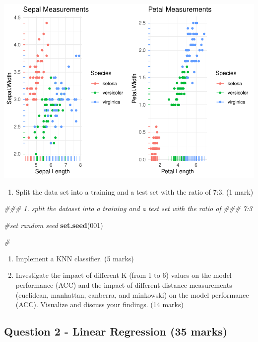 \documentclass[
]{article}
\newenvironment{Shaded}{\begin{snugshade}}{\end{snugshade}}
\newcommand{\CommentTok}[1]{\textcolor[rgb]{0.56,0.35,0.01}{\textit{#1}}}
\newcommand{\DecValTok}[1]{\textcolor[rgb]{0.00,0.00,0.81}{#1}}
\newcommand{\KeywordTok}[1]{\textcolor[rgb]{0.13,0.29,0.53}{\textbf{#1}}}
\newcommand{\NormalTok}[1]{#1}
\providecommand{\tightlist}{%
  \setlength{\itemsep}{0pt}\setlength{\parskip}{0pt}}
\begin{document}
\includegraphics{assessment-1_files/figure-latex/unnamed-chunk-1-1.pdf}

\begin{enumerate}
\def\labelenumi{\arabic{enumi}.}
\tightlist
\item
  Split the data set into a training and a test set with the ratio of
  7:3. (1 mark)
\end{enumerate}

\begin{Shaded}
\begin{Highlighting}[]
\CommentTok{### 1. split the dataset into a training and a test set with the ratio of}
\CommentTok{### 7:3}

\CommentTok{#set random seed}
\KeywordTok{set.seed}\NormalTok{(}\DecValTok{001}\NormalTok{)}


\CommentTok{#}
\end{Highlighting}
\end{Shaded}

\begin{enumerate}
\def\labelenumi{\arabic{enumi}.}
\setcounter{enumi}{1}
\item
  Implement a KNN classifier. (5 marks)
\item
  Investigate the impact of different K (from 1 to 6) values on the
  model performance (ACC) and the impact of different distance
  measurements (euclidean, manhattan, canberra, and minkowski) on the
  model performance (ACC). Visualize and discuss your findings. (14
  marks)
\end{enumerate}

\hypertarget{question-2---linear-regression-35-marks}{%
\subsection{Question 2 - Linear Regression (35
marks)}\label{question-2---linear-regression-35-marks}}
\end{document}
